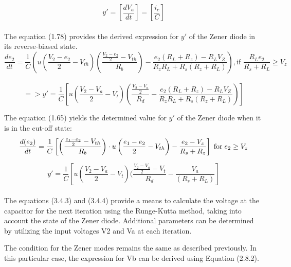 \begin{equation}
    y'=[\frac{dV_a}{dt}]=[\frac{i_c}{C}]
\end{equation}\\

The equation (1.78) provides the derived expression for $y'$ of the Zener diode in its reverse-biased state.\\

\begin{equation}
    \frac{de_2}{dt}=\frac{1}{C}\left(u\left(\frac{V_2-e_2}{2}-V_{th}\right)\left(\frac{\frac{V_2-e_2}{2}-V_{th}}{R_b}\right)-\frac{e_2(R_L+R_z)-R_LV_Z}{R_zR_L+R_s(R_z+R_L)}\right), \text{if } \frac{R_Le_2}{R_s+R_L} \geq V_z
\end{equation}\\

\begin{equation}
    =>y'=\frac{1}{C}[u(\frac{V_2-V_a}{2}-V_t)(\frac{\frac{V_2-V_a}{2}}{R_d}-\frac{e_2(R_L+R_z)-R_LV_Z}{R_zR_L+R_s(R_z+R_L)})]
\end{equation}

The equation (1.65) yields the determined value for $y'$ of the Zener diode when it is in the cut-off state:\\

\begin{equation}
    \frac{d(e_2)}{dt}=\frac{1}{C}\left[\left(\frac{\frac{e_1 - e_2}{2} - V_{th}}{R_b} \right)\cdot u\left(\frac{e_1 - e_2}{2} - V_{th} \right)-\frac{e_2-V_z}{R_s+R_z} \right] \hspace{0.1cm} \text{for} \hspace{0.1cm} e_2 \geq V_z
\end{equation}

\begin{equation}
    y'=\frac{1}{C}[u(\frac{V_2-V_a}{2}-V_t)(\frac{\frac{V_2-V_a}{2}-V_t}{R_d}-\frac{V_a}{(R_s+R_L)}]
\end{equation}\\

The equations (3.4.3) and (3.4.4) provide a means to calculate the voltage at the capacitor for the next iteration using the Runge-Kutta method, taking into account the state of the Zener diode. Additional parameters can be determined by utilizing the input voltages V2 and Va at each iteration.

The condition for the Zener modes remains the same as described previously. In this particular case, the expression for Vb can be derived using Equation (2.8.2).\\

